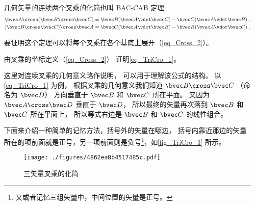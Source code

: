 

几何矢量的连续两个叉乘的化简也叫 BAC-CAB 定理
\begin{gather}
\bvec A \cross (\bvec B \cross \bvec C) = \bvec B (\bvec A \vdot \bvec C) - \bvec C (\bvec A \vdot \bvec B)\label{eq_TriCro_1}~,\\
(\bvec B \cross \bvec C) \cross \bvec A = \bvec C (\bvec A \vdot \bvec B) - \bvec B (\bvec A \vdot \bvec C)~,
\end{gather}

要证明这个定理可以将每个叉乘在各个基底上展开（\autoref{eq_Cross_2}）。

\begin{exercise}{}
由叉乘的坐标定义（\autoref{eq_Cross_2}） 证明\autoref{eq_TriCro_1}。
\end{exercise} 

这里对连续叉乘的几何意义略作说明， 可以用于理解该公式的结构。 以\autoref{eq_TriCro_1} 为例， 根据叉乘的几何意义我们知道 $\bvec B \cross \bvec C$ （命名为 $\bvec D$） 方向垂直于 $\bvec B$ 和 $\bvec C$ 所在平面。 又因为 $\bvec A \cross \bvec D$ 垂直于 $\bvec D$， 所以最终的矢量再次落到 $\bvec B$ 和 $\bvec C$ 所在平面上， 所以等式右边是 $\bvec B$ 和 $\bvec C$ 的线性组合。

下面来介绍一种简单的记忆方法，括号外的矢量在哪边， 括号内靠近那边的矢量所在的项前面就是正号，另一项前面则是负号\footnote{又或者记忆三组矢量中，中间位置的矢量是正号。}，如\autoref{fig_TriCro_1} 所示。

\begin{figure}[ht]
\centering
\texttt{[image: ./figures/4862ea8b4517485c.pdf]}
\caption{三矢量叉乘的化简}\label{fig_TriCro_1}
\end{figure}
